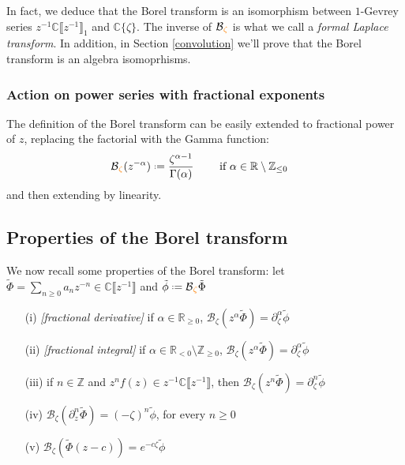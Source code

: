 \documentclass{article}
\theoremstyle{definition}
\newcommand{\Z}{\mathbb{Z}}
\newcommand{\R}{\mathbb{R}}
\newcommand{\C}{\mathbb{C}}
\newcommand*{\defeq}{\mathrel{\vcenter{\baselineskip0.5ex \lineskiplimit0pt
                     \hbox{\scriptsize.}\hbox{\scriptsize.}}}%
                     =}
\newcommand{\borel}{\mathcal{B}}
\theoremstyle{plain}
\begin{document}
In fact, we deduce that the Borel transform is an isomorphism between $1$-Gevrey series $z^{-1}\C\llbracket z^{-1}\rrbracket_1$ and $\C\lbrace\zeta\rbrace$. The inverse of $\borel\textcolor{orange}{_\zeta}$ is what we call a \textit{formal Laplace transform}. In addition, in Section \ref{convolution} we’ll prove that the Borel transform is an algebra isomoprhisms. 


\subsubsection{Action on power series with fractional exponents}
The definition of the Borel transform can be easily extended to fractional power of $z$, replacing the factorial with the Gamma function: 
\begin{align*}
\borel\textcolor{orange}{_\zeta}(z^{-\alpha})\defeq \frac{\zeta^{\alpha-1}}{\Gamma(\alpha)} & \qquad \text{ if } \alpha\in\R\setminus\Z_{\leq 0}
\end{align*}
and then extending by linearity.

\subsection{Properties of the Borel transform}\label{properties Borel transform}
We now recall some properties of the Borel transform: let $\tilde{\Phi}=\sum_{n\geq 0}a_nz^{-n}\in\C\llbracket z^{-1}\rrbracket$ and $\tilde{\phi}\defeq\borel\textcolor{orange}{_\zeta}\tilde{\Phi}$
\begin{itemize}
\item[(i)] \emph{[fractional derivative]} if $\alpha\in\R_{\geq 0}$, $\borel_\zeta\left(z^\alpha \tilde{\Phi}\right)=\partial_{\zeta}^{\alpha}\tilde{\phi}$
\item[(ii)] \emph{[fractional integral]} if $\alpha\in\R_{<0}\setminus\Z_{\geq 0}$, $\borel_\zeta\left(z^\alpha \tilde{\Phi}\right)=\partial_{\zeta}^{\alpha}\tilde{\phi}$
\item[(iii)] if $n\in\Z$ and $z^nf(z)\in z^{-1}\C \llbracket z^{-1} \rrbracket$, then $\borel_\zeta (z^n\tilde{\Phi})=\partial_\zeta^n\tilde{\phi}$ 
\item[(iv)] $\borel_\zeta\left(\partial_z^{n} \tilde{\Phi}\right)=(-\zeta)^n\tilde{\phi}$, for every $n\geq 0$
\item[(v)] $\borel_{\zeta}(\tilde{\Phi}(z-c))=e^{-c\zeta}\tilde{\phi}$
\end{itemize} 
\end{document}
